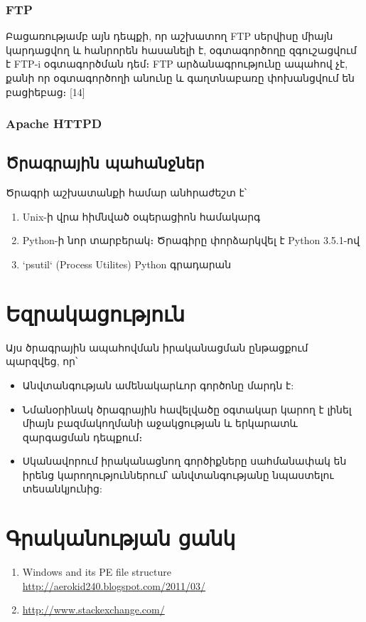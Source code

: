 \documentclass[11pt]{article}
\begin{document}
\begin{sloppypar}
\subsubsection{FTP}

Բացառությամբ այն դեպքի, որ աշխատող FTP սերվիսը միայն կարդացվող և
հանրորեն հասանելի է, օգտագործողը զգուշացվում է FTP-i օգտագործման դեմ։
FTP արձանագրությունը ապահով չէ, քանի որ օգտագործողի անունը և
գաղտնաբառը փոխանցվում են բացիեբաց։ [14]


\subsubsection{Apache HTTPD}


\subsection{Ծրագրային պահանջներ}

Ծրագրի աշխատանքի համար անհրաժեշտ է՝

\begin{enumerate}
\item Unix-ի վրա հիմնված օպերացիոն համակարգ
\item Python-ի նոր տարբերակ։ Ծրագիրը փորձարկվել է Python 3.5.1-ով
\item `psutil` (Process Utilites) Python գրադարան
\end{enumerate}


\newpage
\section{Եզրակացություն}

Այս ծրագրային ապահովման իրականացման ընթացքում պարզվեց, որ՝

\begin{itemize}
\item Անվտանգության ամենակարևոր գործոնը մարդն է:
\item Նմանօրինակ ծրագրային հավելվածը օգտակար կարող է
    լինել միայն բազմակողմանի աջակցության և երկարատև զարգացման
    դեպքում։
\item Սկանավորում իրականացնող գործիքները սահմանափակ են
    իրենց կարողություններում՝ անվտանգությանը նպաստելու
    տեսանկյունից:
\end{itemize}







\newpage
\section*{Գրականության ցանկ}
\begin{enumerate}
\item Windows and its PE file structure\\
	\url{http://aerokid240.blogspot.com/2011/03/}
\item \url{http://www.stackexchange.com/}
\end{enumerate}



\end{sloppypar}
\end{document}
